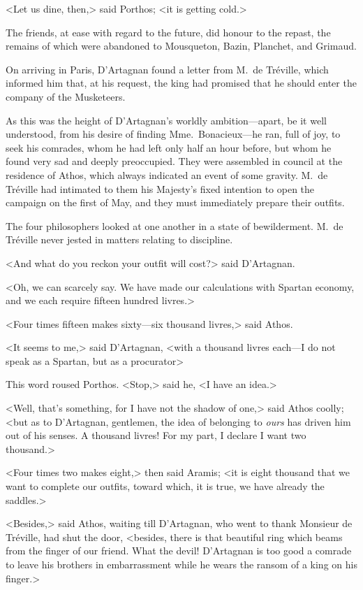 <Let us dine, then,> said Porthos; <it is getting cold.> 

The friends, at ease with regard to the future, did honour to the repast, the remains of which were abandoned to Mousqueton, Bazin, Planchet, and Grimaud. 

On arriving in Paris, D'Artagnan found a letter from M.~de Tréville, which informed him that, at his request, the king had promised that he should enter the company of the Musketeers. 

As this was the height of D'Artagnan's worldly ambition—apart, be it well understood, from his desire of finding Mme.~Bonacieux—he ran, full of joy, to seek his comrades, whom he had left only half an hour before, but whom he found very sad and deeply preoccupied. They were assembled in council at the residence of Athos, which always indicated an event of some gravity. M.~de Tréville had intimated to them his Majesty's fixed intention to open the campaign on the first of May, and they must immediately prepare their outfits. 

The four philosophers looked at one another in a state of bewilderment. M.~de Tréville never jested in matters relating to discipline. 

<And what do you reckon your outfit will cost?> said D'Artagnan. 

<Oh, we can scarcely say. We have made our calculations with Spartan economy, and we each require fifteen hundred livres.> 

<Four times fifteen makes sixty—six thousand livres,> said Athos. 

<It seems to me,> said D'Artagnan, <with a thousand livres each—I do not speak as a Spartan, but as a procurator\longdash> 

This word  roused Porthos. <Stop,> said he, <I have an idea.> 

<Well, that's something, for I have not the shadow of one,> said Athos coolly; <but as to D'Artagnan, gentlemen, the idea of belonging to \emph{ours} has driven him out of his senses. A thousand livres! For my part, I declare I want two thousand.> 

<Four times two makes eight,> then said Aramis; <it is eight thousand that we want to complete our outfits, toward which, it is true, we have already the saddles.> 

<Besides,> said Athos, waiting till D'Artagnan, who went to thank Monsieur de Tréville, had shut the door, <besides, there is that beautiful ring which beams from the finger of our friend. What the devil! D'Artagnan is too good a comrade to leave his brothers in embarrassment while he wears the ransom of a king on his finger.> 